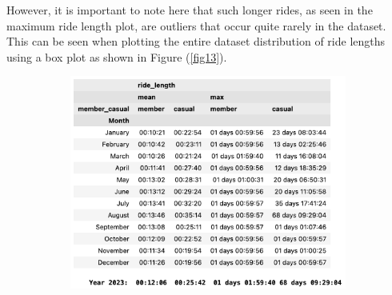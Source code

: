 \documentclass[12pt]{article}
\begin{document}
However, it is important to note here that such longer rides, as seen in the maximum ride length plot, are outliers that occur quite rarely in the dataset. This can be seen when plotting the entire dataset distribution of ride lengths using a box plot as shown in Figure (\ref{fig13}).  

	\begin{figure}[h]
	\centering
		\begin{subfigure}[b]{0.55\textwidth}
   			\includegraphics[scale=0.6]{imgMeanMax2.png} 
			\caption{}
			\label{fig11_1}
		\end{subfigure}


\end{figure}
\end{document}
